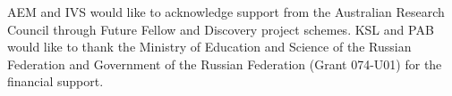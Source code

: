 \documentclass[aps,prl,twocolumn,showpacs,superscriptaddress,groupedaddress]{revtex4-1}
\begin{document}
\begin{acknowledgments}
  AEM and IVS would like to acknowledge support from the Australian
  Research Council through Future Fellow and Discovery project
  schemes. KSL and PAB would like to thank the Ministry of Education and
  Science of the Russian Federation  and Government of the
  Russian Federation (Grant 074-U01) for the financial support.
\end{acknowledgments}


\end{document}
